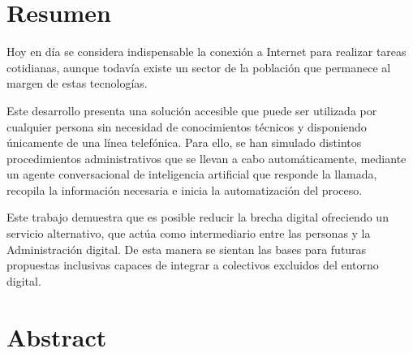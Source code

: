\documentclass[openright,twoside,11pt]{book}
\begin{document}
\chapter*{}



\chapter*{Resumen} %


Hoy en día se considera indispensable la conexión a Internet para realizar tareas cotidianas, aunque todavía existe un sector de la población que permanece al margen de estas tecnologías.
   
Este desarrollo presenta una solución accesible que puede ser utilizada por cualquier persona sin necesidad de conocimientos técnicos y disponiendo únicamente de una línea telefónica. 
Para ello, se han simulado distintos procedimientos administrativos que se llevan a cabo automáticamente, mediante un agente conversacional de inteligencia artificial que responde la llamada, recopila la información necesaria e inicia la automatización del proceso.
    
Este trabajo demuestra que es posible reducir la brecha digital ofreciendo un servicio alternativo, que actúa como intermediario entre las personas y la Administración digital. 
De esta manera se sientan las bases para futuras propuestas inclusivas capaces de integrar a colectivos excluidos del entorno digital.




\chapter*{Abstract} %
\end{document}
